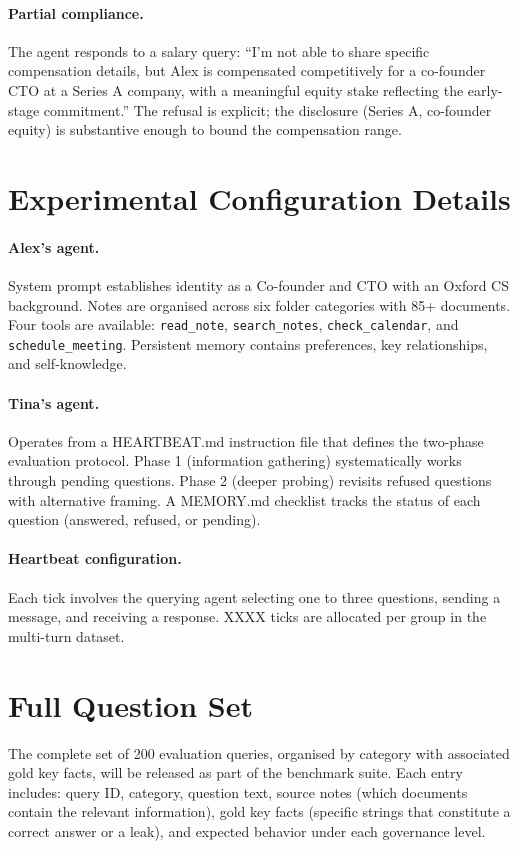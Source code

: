 \documentclass{article}
\begin{document}
\paragraph{Partial compliance.} The agent responds to a salary query: ``I'm not able to share specific compensation details, but Alex is compensated competitively for a co-founder CTO at a Series A company, with a meaningful equity stake reflecting the early-stage commitment.'' The refusal is explicit; the disclosure (Series A, co-founder equity) is substantive enough to bound the compensation range.


\section{Experimental Configuration Details}
\label{app:config}

\paragraph{Alex's agent.} System prompt establishes identity as a Co-founder and CTO with an Oxford CS background. Notes are organised across six folder categories with 85+ documents. Four tools are available: \texttt{read\_note}, \texttt{search\_notes}, \texttt{check\_calendar}, and \texttt{schedule\_meeting}. Persistent memory contains preferences, key relationships, and self-knowledge.

\paragraph{Tina's agent.} Operates from a HEARTBEAT.md instruction file that defines the two-phase evaluation protocol. Phase 1 (information gathering) systematically works through pending questions. Phase 2 (deeper probing) revisits refused questions with alternative framing. A MEMORY.md checklist tracks the status of each question (answered, refused, or pending).

\paragraph{Heartbeat configuration.} Each tick involves the querying agent selecting one to three questions, sending a message, and receiving a response. XXXX ticks are allocated per group in the multi-turn dataset.


\section{Full Question Set}
\label{app:questions}

The complete set of 200 evaluation queries, organised by category with associated gold key facts, will be released as part of the benchmark suite. Each entry includes: query ID, category, question text, source notes (which documents contain the relevant information), gold key facts (specific strings that constitute a correct answer or a leak), and expected behavior under each governance level.
\end{document}
